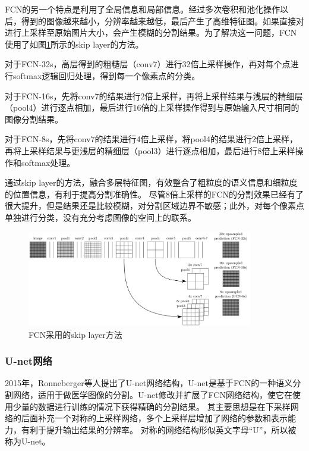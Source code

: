 FCN的另一个特点是利用了全局信息和局部信息。经过多次卷积和池化操作以后，得到的图像越来越小，分辨率越来越低，最后产生了高维特征图。如果直接对进行上采样至原始图片大小，会产生模糊的分割结果。为了解决这一问题，FCN使用了如图\ref{fig:FCN_skip}所示的skip layer的方法。

对于FCN-32s，高层得到的粗糙层（conv7）进行32倍上采样操作，再对每个点进行softmax逻辑回归处理，得到每一个像素点的分类。

对于FCN-16s，先将conv7的结果进行2倍上采样，再将上采样结果与浅层的精细层（pool4）进行逐点相加，最后进行16倍的上采样操作得到与原始输入尺寸相同的图像分割结果。

对于FCN-8s，先将conv7的结果进行4倍上采样，将pool4的结果进行2倍上采样，再将上采样结果与更浅层的精细层（pool3）进行逐点相加，最后进行8倍上采样操作和softmax处理。

通过skip layer的方法，融合多层特征图，有效整合了粗粒度的语义信息和细粒度的位置信息，有利于提高分割准确性。
尽管8倍上采样的FCN的分割效果已经有了很大提升，但是结果还是比较模糊，对分割区域边界不敏感；此外，对每个像素点单独进行分类，没有充分考虑图像的空间上的联系。

\begin{figure}[htp]
	\centering
	\includegraphics[width=0.88\textwidth]{figures/FCN_skip.png}
	\caption{FCN采用的skip layer方法}
	\label{fig:FCN_skip}
\end{figure}

\subsubsection{U-net网络}
2015年，Ronneberger等人\cite{DBLP:conf/miccai/RonnebergerFB15}提出了U-net网络结构，U-net是基于FCN的一种语义分割网络，适用于做医学图像的分割。U-net修改并扩展了FCN网络结构，使它在使用少量的数据进行训练的情况下获得精确的分割结果。
其主要思想是在下采样网络的后面补充一个对称的上采样网络，多个上采样层增加了网络的参数和表示能力，有利于提升输出结果的分辨率。
对称的网络结构形似英文字母“U”，所以被称为U-net。


